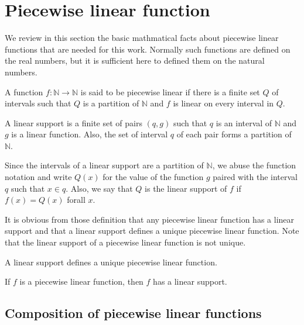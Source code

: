 
\section{Piecewise linear function}\label{sec:pwl}

We review in this section the basic mathmatical facts about piecewise linear
functions that are needed for this work. Normally such functions are defined on
the real numbers, but it is sufficient here to defined them on the natural
numbers.

\begin{definition}
  \label{def:PW}
  A function $f : \mathbb{N} \rightarrow \mathbb{N}$ is said to be piecewise
  linear if there is a finite set $Q$ of intervals such that $Q$ is a partition
  of $\mathbb{N}$ and $f$ is linear on every interval in $Q$.
\end{definition}

\begin{definition}
  \label{def:PW_support}
  A linear support is a finite set of pairs $(q,g)$ such that $q$ is an interval
  of $\mathbb{N}$ and $g$ is a linear function. Also, the set of interval $q$ of
  each pair forms a partition of $\mathbb{N}$.
\end{definition}
Since the intervals of a linear support are a partition of $\mathbb{N}$, we
abuse the function notation and write $Q(x)$ for the value of the function $g$
paired with the interval $q$ such that $x \in q$. Also, we say that $Q$ is the
linear support of $f$ if $f(x) = Q(x)$ forall $x$.

It is obvious from those definition that any piecewise linear function has a
linear support and that a linear support defines a unique piecewise linear function.
Note that the linear support of a piecewise linear function is not unique.
\begin{lemma}
  \label{thm:support_unique_pl}
  A linear support defines a unique piecewise linear function.
\end{lemma}
\begin{lemma}
  If $f$ is a piecewise linear function, then $f$ has a linear support.
\end{lemma}

\subsection{Composition of piecewise linear functions}



